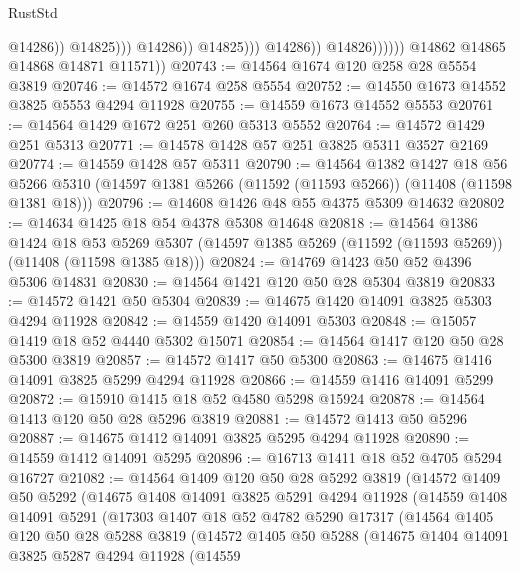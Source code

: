 \begin{lexlean}{RustStd}
\begin{coremodule}
                                            @14286))
                                        @14825)))
                                  @14286))
                              @14825)))
                        @14286))
                    @14826))))))
        @14862
        @14865
        @14868
        @14871
        @11571))
@20743 := @14564 @1674 @120 @258 @28 @5554 @3819
@20746 := @14572 @1674 @258 @5554
@20752 := @14550 @1673 @14552 @3825 @5553 @4294 @11928
@20755 := @14559 @1673 @14552 @5553
@20761 := @14564 @1429 @1672 @251 @260 @5313 @5552
@20764 := @14572 @1429 @251 @5313
@20771 := @14578 @1428 @57 @251 @3825 @5311 @3527 @2169
@20774 := @14559 @1428 @57 @5311
@20790 := @14564
    @1382
    @1427
    @18
    @56
    @5266
    @5310
    (@14597 @1381 @5266 (@11592 (@11593 @5266)) (@11408 (@11598 @1381 @18)))
@20796 := @14608 @1426 @48 @55 @4375 @5309 @14632
@20802 := @14634 @1425 @18 @54 @4378 @5308 @14648
@20818 := @14564
    @1386
    @1424
    @18
    @53
    @5269
    @5307
    (@14597 @1385 @5269 (@11592 (@11593 @5269)) (@11408 (@11598 @1385 @18)))
@20824 := @14769 @1423 @50 @52 @4396 @5306 @14831
@20830 := @14564 @1421 @120 @50 @28 @5304 @3819
@20833 := @14572 @1421 @50 @5304
@20839 := @14675 @1420 @14091 @3825 @5303 @4294 @11928
@20842 := @14559 @1420 @14091 @5303
@20848 := @15057 @1419 @18 @52 @4440 @5302 @15071
@20854 := @14564 @1417 @120 @50 @28 @5300 @3819
@20857 := @14572 @1417 @50 @5300
@20863 := @14675 @1416 @14091 @3825 @5299 @4294 @11928
@20866 := @14559 @1416 @14091 @5299
@20872 := @15910 @1415 @18 @52 @4580 @5298 @15924
@20878 := @14564 @1413 @120 @50 @28 @5296 @3819
@20881 := @14572 @1413 @50 @5296
@20887 := @14675 @1412 @14091 @3825 @5295 @4294 @11928
@20890 := @14559 @1412 @14091 @5295
@20896 := @16713 @1411 @18 @52 @4705 @5294 @16727
@21082 := @14564
    @1409
    @120
    @50
    @28
    @5292
    @3819
    (@14572
      @1409
      @50
      @5292
      (@14675
        @1408
        @14091
        @3825
        @5291
        @4294
        @11928
        (@14559
          @1408
          @14091
          @5291
          (@17303
            @1407
            @18
            @52
            @4782
            @5290
            @17317
            (@14564
              @1405
              @120
              @50
              @28
              @5288
              @3819
              (@14572
                @1405
                @50
                @5288
                (@14675
                  @1404
                  @14091
                  @3825
                  @5287
                  @4294
                  @11928
                  (@14559

\end{coremodule}
\end{lexlean}
